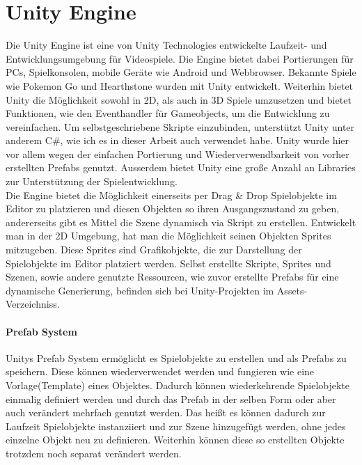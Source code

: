 \section{Unity Engine}
\label{ch:Grundlagen:sec:Unity}
Die Unity Engine ist eine von Unity Technologies entwickelte Laufzeit- und Entwicklungsumgebung für Videospiele. Die Engine bietet dabei Portierungen für PCs, Spielkonsolen, mobile Geräte wie Android und Webbrowser. Bekannte Spiele wie Pokemon Go und Hearthstone wurden mit Unity entwickelt. Weiterhin bietet Unity die Möglichkeit sowohl in 2D, als auch in 3D Spiele umzusetzen und bietet Funktionen, wie den Eventhandler für Gameobjects, um die Entwicklung zu vereinfachen. Um selbstgeschriebene Skripte einzubinden, unterstützt Unity unter anderem C\#, wie ich es in dieser Arbeit auch verwendet habe. Unity wurde hier vor allem wegen der einfachen Portierung und Wiederverwendbarkeit von vorher erstellten Prefabs genutzt. Ausserdem bietet Unity eine große Anzahl an Libraries zur Unterstützung der Spielentwicklung. \\Die Engine bietet die Möglichkeit einerseits per Drag \& Drop Spielobjekte im Editor zu platzieren und diesen Objekten so ihren Ausgangszustand zu geben, andererseits gibt es Mittel die Szene dynamisch via Skript zu erstellen. Entwickelt man in der 2D Umgebung, hat man die Möglichkeit seinen Objekten Sprites mitzugeben. Diese Sprites sind Grafikobjekte, die zur Darstellung der Spielobjekte im Editor platziert werden. Selbst erstellte Skripte, Sprites und Szenen, sowie andere genutzte Ressourcen, wie zuvor erstellte Prefabs für eine dynamische Generierung, befinden sich bei Unity-Projekten im Assets-Verzeichniss.%

\paragraph{Prefab System}
\nocite{UPrefabs}
Unitys Prefab System ermöglicht es Spielobjekte zu erstellen und als Prefabs zu speichern. Diese können wiederverwendet werden und fungieren wie eine Vorlage(Template) eines Objektes. Dadurch können wiederkehrende Spielobjekte einmalig definiert werden und durch das Prefab in der selben Form oder aber auch verändert mehrfach genutzt werden. Das heißt es können dadurch zur Laufzeit Spielobjekte instanziiert und zur Szene hinzugefügt werden, ohne jedes einzelne Objekt neu zu definieren. Weiterhin können diese so erstellten Objekte trotzdem noch separat verändert werden. \nocite{UPrefabs}

